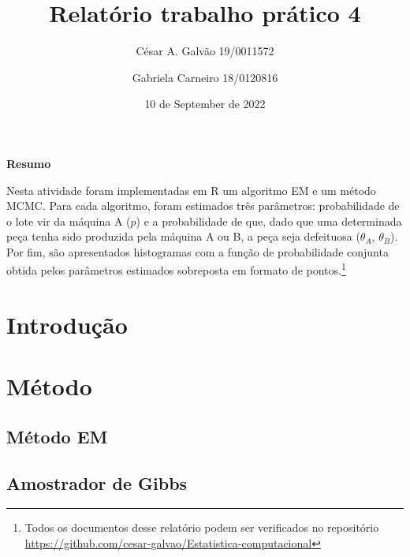 \documentclass[
]{article}
\title{Relatório trabalho prático 4}
\author{César A. Galvão 19/0011572 \and Gabriela Carneiro 18/0120816}
\date{10 de September de 2022}
\begin{document}
\maketitle

\newpage{}

{
\setcounter{tocdepth}{2}
\tableofcontents
}
\let\oldsection\section
\renewcommand\section{\clearpage\oldsection}

\begin{center} 

\textbf{Resumo} 

\end{center}

Nesta atividade foram implementadas em R um algoritmo EM e um método
MCMC. Para cada algoritmo, foram estimados três parâmetros:
probabilidade de o lote vir da máquina A (\(p\)) e a probabilidade de
que, dado que uma determinada peça tenha sido produzida pela máquina A
ou B, a peça seja defeituosa (\(\theta_A\), \(\theta_B\)). Por fim, são
apresentados histogramas com a função de probabilidade conjunta obtida
pelos parâmetros estimados sobreposta em formato de pontos.\footnote{Todos
  os documentos desse relatório podem ser verificados no repositório
  \url{https://github.com/cesar-galvao/Estatistica-computacional}}

\hypertarget{introduuxe7uxe3o}{%
\section{Introdução}\label{introduuxe7uxe3o}}

\hypertarget{muxe9todo}{%
\section{Método}\label{muxe9todo}}

\hypertarget{muxe9todo-em}{%
\subsection{Método EM}\label{muxe9todo-em}}

\hypertarget{amostrador-de-gibbs}{%
\subsection{Amostrador de Gibbs}\label{amostrador-de-gibbs}}
\end{document}
